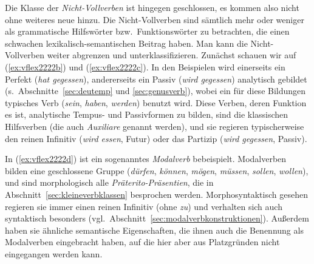 
Die Klasse der \textit{Nicht-Vollverben} ist hingegen geschlossen, es kommen also nicht ohne weiteres neue hinzu.
Die Nicht-Vollverben sind sämtlich mehr oder weniger als grammatische Hilfswörter bzw.\ Funktionswörter zu betrachten, die einen schwachen lexikalisch-semantischen Beitrag haben.
Man kann die Nicht-Vollverben weiter abgrenzen und unterklassifizieren.
Zunächst schauen wir auf (\ref{ex:vflex2222b}) und (\ref{ex:vflex2222c}).
In den Beispielen wird einerseits ein Perfekt (\textit{hat gegessen}), andererseits ein Passiv (\textit{wird gegessen}) analytisch gebildet (s.\ Abschnitte~\ref{sec:deutemp} und \ref{sec:genusverb}), wobei ein für diese Bildungen typisches Verb (\textit{sein}, \textit{haben}, \textit{werden}) benutzt wird.
Diese Verben, deren Funktion es ist, analytische Tempus- und Passivformen zu bilden, sind die klassischen Hilfsverben (die auch \textit{Auxiliare} genannt werden), und sie regieren typischerweise den reinen Infinitiv (\textit{wird essen}, Futur) oder das Partizip (\textit{wird gegessen}, Passiv).


In (\ref{ex:vflex2222d}) ist ein sogenanntes \textit{Modalverb} bebeispielt.
Modalverben bilden eine geschlossene Gruppe (\textit{dürfen}, \textit{können}, \textit{mögen}, \textit{müssen}, \textit{sollen}, \textit{wollen}), und sind morphologisch alle \textit{Präterito-Präsentien}, die in Abschnitt~\ref{sec:kleineverbklassen} besprochen werden.
Morphosyntaktisch gesehen regieren sie immer einen reinen Infinitiv (ohne \textit{zu}) und verhalten sich auch syntaktisch besonders (vgl.\ Abschnitt~\ref{sec:modalverbkonstruktionen}).
Außerdem haben sie ähnliche semantische Eigenschaften, die ihnen auch die Benennung als Modalverben eingebracht haben, auf die hier aber aus Platzgründen nicht eingegangen werden kann.


